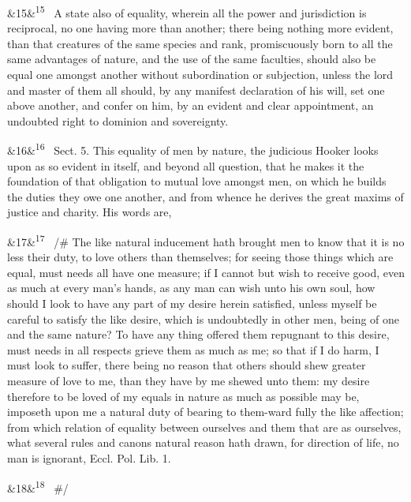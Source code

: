 \documentclass[12pt]{article}
\newcommand{\para}[1][]{\par\noindent\ifx&#1&\else\textsuperscript{\footnotesize #1}~\fi}
\begin{document}
\para[15] A state also of equality, wherein all the power and jurisdiction is reciprocal, no one having more than another; there being nothing more evident, than that creatures of the same species and rank, promiscuously born to all the same advantages of nature, and the use of the same faculties, should also be equal one amongst another without subordination or subjection, unless the lord and master of them all should, by any manifest declaration of his will, set one above another, and confer on him, by an evident and clear appointment, an undoubted right to dominion and sovereignty.

\para[16] Sect. 5. This equality of men by nature, the judicious Hooker looks upon as so evident in itself, and beyond all question, that he makes it the foundation of that obligation to mutual love amongst men, on which he builds the duties they owe one another, and from whence he derives the great maxims of justice and charity. His words are,

\para[17] /\# The like natural inducement hath brought men to know that it is no less their duty, to love others than themselves; for seeing those things which are equal, must needs all have one measure; if I cannot but wish to receive good, even as much at every man's hands, as any man can wish unto his own soul, how should I look to have any part of my desire herein satisfied, unless myself be careful to satisfy the like desire, which is undoubtedly in other men, being of one and the same nature? To have any thing offered them repugnant to this desire, must needs in all respects grieve them as much as me; so that if I do harm, I must look to suffer, there being no reason that others should shew greater measure of love to me, than they have by me shewed unto them: my desire therefore to be loved of my equals in nature as much as possible may be, imposeth upon me a natural duty of bearing to them-ward fully the like affection; from which relation of equality between ourselves and them that are as ourselves, what several rules and canons natural reason hath drawn, for direction of life, no man is ignorant, Eccl. Pol. Lib. 1.

\para[18] \#/
\end{document}
